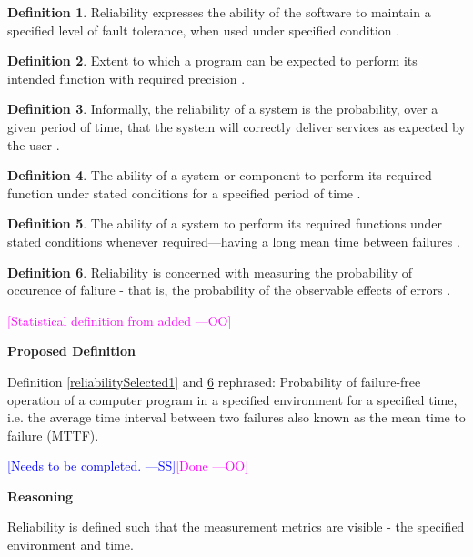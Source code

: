 \documentclass[letterpaper,cleveref]{lipics-v2019}
\newcommand{\authornote}[3]{\textcolor{#1}{[#3 ---#2]}}
\newcommand{\authornote}[3]{}
\newcommand{\wss}[1]{\authornote{blue}{SS}{#1}} %
\newcommand{\oo}[1]{\authornote{magenta}{OO}{#1}} %
\theoremstyle{definition}
\newtheorem{defn}{Definition}
\begin{document}
\begin{defn}
  Reliability expresses the ability of the software to maintain a specified
  level of fault tolerance, when used under specified condition
  \citep{singh2013different}.
\end{defn}

\begin{defn}
  Extent to which a program can be expected to perform its intended function
  with required precision \citep{McCallEtAl1977}.
\end{defn}

\begin{defn}
  Informally, the reliability of a system is the probability, over a given
  period of time, that the system will correctly deliver services as expected by
  the user \citep{sommerville}.
\end{defn}
	
\begin{defn}
  The ability of a system or component to perform its required function under
  stated conditions for a specified period of time
  \citep{IEEEComputerDictionary1991}.
\end{defn}

\begin{defn}
  The ability of a system to perform its required functions under stated
  conditions whenever required—having a long mean time between failures
  \citep{mcconnell2004code}.
\end{defn}
\begin{defn} \label{reliabilitySelected2} Reliability is concerned with measuring
	the probability of occurence of faliure - that is, the probability of the
	observable effects of errors \citep{GhezziEtAl2003}.
\end{defn}
\oo{Statistical definition from  \citep{GhezziEtAl2003} added}
  

\noindent \textbf{Proposed Definition}

Definition \ref{reliabilitySelected1} and \ref{reliabilitySelected2} rephrased:
Probability of failure-free operation of a computer program in a specified
environment for a specified time, i.e. the average time interval between two
failures also known as the mean time to failure (MTTF).

\wss{Needs to be completed.}\oo{Done}

\noindent \textbf{Reasoning}

Reliability is defined such that the measurement metrics are visible - the
specified environment and time. 
\end{document}
